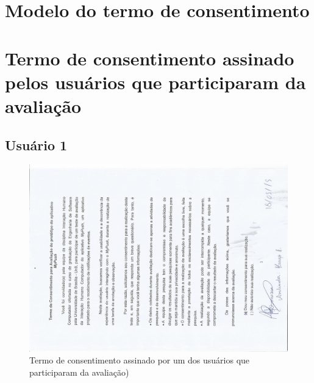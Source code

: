 \begin{anexosenv}
  \chapter{Modelo do termo de consentimento}
  
    
  
  \chapter{Termo de consentimento assinado pelos usuários que participaram da avaliação}
  
    \section*{Usuário 1}
    \begin{figure}[!htbp]
      \centering
      \includegraphics[scale=0.7, angle=-90]{editaveis/figuras/termousuario1}
      \caption{Termo de consentimento assinado por um dos usuários que participaram da avaliação)}
      \label{termo_consentimento_1}
    \end{figure}
   

\end{anexosenv}
